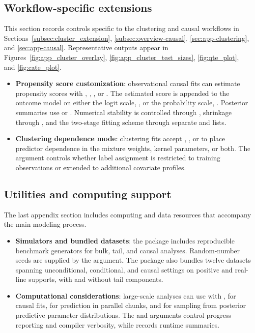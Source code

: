\documentclass[article]{jss}\usepackage[]{graphicx}\usepackage[]{xcolor}
\begin{document}
\subsection{Workflow-specific extensions}
\label{subsec:app-workflows}

This section records controls specific to the clustering and causal workflows in Sections~\ref{subsec:cluster_extension}, \ref{subsec:overview-causal}, \ref{sec:app-clustering}, and \ref{sec:app-causal}. Representative outputs appear in Figures~\ref{fig:app_cluster_overlay}, \ref{fig:app_cluster_test_sizes}, \ref{fig:qte_plot}, and \ref{fig:cate_plot}.

\begin{itemize}
\item \textbf{Propensity score customization}: observational causal fits can estimate propensity scores with , , , or . The estimated score is appended to the outcome model on either the logit scale, , or the probability scale, . Posterior summaries use  or . Numerical stability is controlled through , shrinkage through , and the two-stage fitting scheme through separate  and  lists.
\item \textbf{Clustering dependence mode}: clustering fits accept , , or  to place predictor dependence in the mixture weights, kernel parameters, or both. The  argument controls whether label assignment is restricted to training observations or extended to additional covariate profiles.

\end{itemize}

\subsection{Utilities and computing support}

The last appendix section includes computing and data resources that
accompany the main modeling process.

\begin{itemize}
\item \textbf{Simulators and bundled datasets}: the package includes reproducible benchmark generators for bulk, tail, and causal analyses. Random-number seeds are supplied by the  argument. The package also bundles twelve datasets spanning unconditional, conditional, and causal settings on positive and real-line supports, with and without tail components.
\item \textbf{Computational considerations}: large-scale analyses can use  with ,  for causal fits,  for prediction in parallel chunks, and  for sampling from posterior predictive parameter distributions. The  and  arguments control progress reporting and compiler verbosity, while  records runtime summaries.
\end{itemize}
\end{document}
